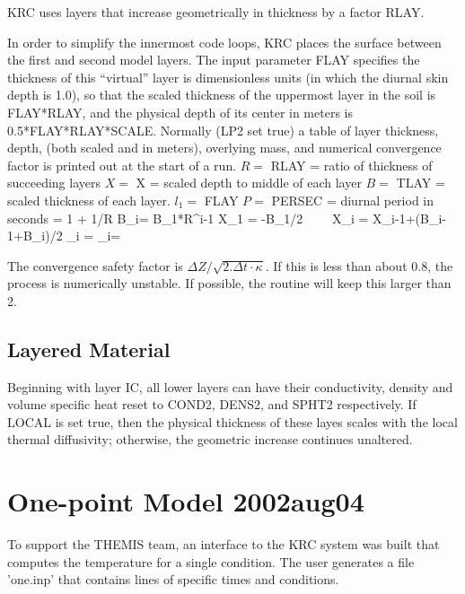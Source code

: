 \documentclass{article}
\begin{document}
KRC uses layers that increase geometrically in thickness by a factor RLAY.

In order to simplify the innermost code loops, KRC places the surface between
the first and second model layers. The input parameter FLAY specifies the
thickness of this ``virtual'' layer is dimensionless units (in which the diurnal
skin depth is 1.0), so that the scaled thickness of the uppermost layer in the soil is
FLAY*RLAY, and the physical depth of its center in meters is 0.5*FLAY*RLAY*SCALE.
Normally (LP2 set true) a table of layer thickness, depth, (both scaled and in
meters), overlying mass, and numerical convergence factor is printed out at the
start of a run.
\qi $R=$ RLAY = ratio of thickness of succeeding layers
\qi $X=$ X = scaled depth to middle of each layer
\qi $B=$ TLAY = scaled thickness of each layer. $l_1=$ FLAY
\qi $P=$ PERSEC = diurnal period in seconds
\qbn {} = 1 + 1/R \qen
\qbn B_i= B_1*R^{i-1}  \qen 
\qbn X_1 = -B_1/2 \ \ \ \ X_i = X_{i-1}+(B_{i-1}+B_i)/2 \qen
\qbn {}_i =  \qen
\qbn {}_i= \qen

The convergence safety factor is $\Delta Z / \sqrt{ 2. \Delta t \cdot
  \kappa}$. If this is less than about 0.8, the process is numerically
unstable. If possible, the routine will keep this larger than 2.

\subsection{Layered Material} %
 Beginning with layer IC, all lower layers can have their conductivity, density
 and volume specific heat reset to COND2, DENS2, and SPHT2 respectively. If
 LOCAL is set true, then the physical thickness of these layes scales with the
 local thermal diffusivity; otherwise, the geometric increase continues unaltered.

\section{One-point Model 2002aug04} %
To support the THEMIS team, an interface to the KRC system was built that
computes the temperature for a single condition. The user generates a file
'one.inp' that contains lines of specific times and conditions.
\end{document}

